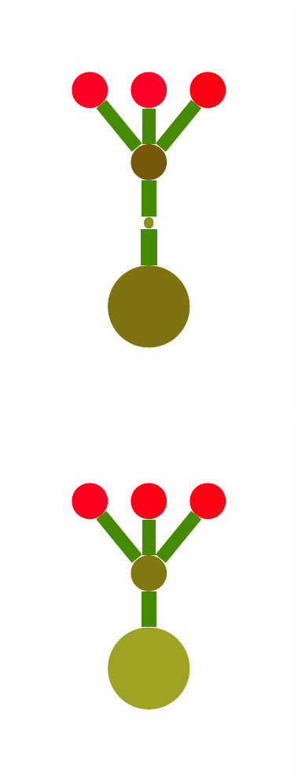 \documentclass[a4paper,10pt]{article}
\begin{document}
\begin{figure}[t]
  \centering
  \includegraphics[scale=.26]{./figures/2-2-initProgram-0.pdf}  
  \includegraphics[scale=.26]{./figures/2-2-initProgram-1.pdf}

\end{figure}
\end{document}
